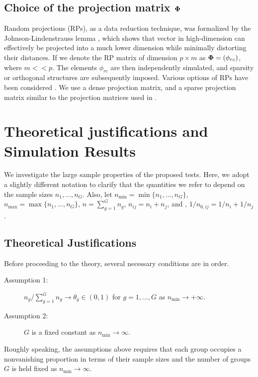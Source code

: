 \documentclass[times,sort&compress,3p]{elsarticle}
\theoremstyle{plain}%
\theoremstyle{definition}
\newcommand{\uPhi}              {\mbox{\boldmath$\Phi$}}
\newcommand{\rsz}[1]{\textcolor{red}{#1}}
\begin{document}
\subsection{Choice of the projection matrix $\uPhi$}
Random projections (RPs), as a data reduction technique, was formalized by the Johnson-Lindenstrauss lemma \cite{johnson84extensionslipschitz}, which shows that vector in high-dimension can effectively be projected into a much lower dimension while minimally distorting their distances. If we denote the RP matrix of dimension $p \times m$ as $\uPhi = (\phi_{rc})$, where $m << p$. The elements $\phi_{rc}$ are then independently simulated, and sparsity or orthogonal structures are subsequently imposed. Various options of RPs have been considered \cite{achlioptas2001database,li2006very,lopes2011more}. We use a dense projection matrix, and a sparse projection matrix similar to the projection matrices used in \cite{srivastava2014raptt,zoh2018powerful}.      

\section{Theoretical justifications and Simulation Results} \label{sec:theori}
We investigate the large sample properties of the proposed tests. 
Here, we adopt a slightly different notation to clarify that the quantities we refer to depend on the sample sizes $n_1, \ldots, n_{G}$. Also, let $n_{\min} = \min\{n_1,\ldots, n_{G}\}$, $n_{\max} = \max\{n_1,\ldots, n_{G}\}$, $n = \sum^{G}_{g=1}n_g$, $n_{ij} = n_i + n_j$, and , $1/n_{0,ij} = 1/n_i + 1/n_j$. %

\subsection{Theoretical Justifications} 
Before proceeding to the theory, several necessary conditions are in order.
\begin{description}
  \item[Assumption 1:] $n_g /\sum_{g=1}^{G}n_g \rightarrow \theta_g \in (0, 1)$ for $g=1,\ldots, G$ as $n_{\min} \rightarrow +\infty$. 
  \item[Assumption 2:] $G$ is a fixed constant as $n_{\min} \rightarrow \infty$.
 \end{description}
  Roughly speaking, the assumptions above requires that each group occupies a nonvanishing proportion in terms of their sample sizes and the number of groups $G$ is held fixed as $n_{\min}\to\infty$.
\end{document}
